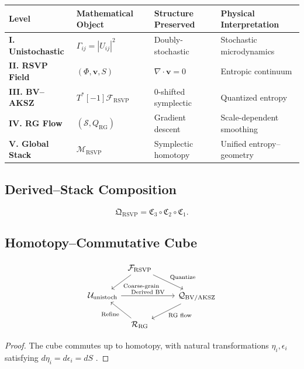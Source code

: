\documentclass[12pt]{article}
\begin{document}
\begin{center}
\begin{tabular}{@{}llll@{}}
\toprule
\textbf{Level} & \textbf{Mathematical Object} & \textbf{Structure Preserved} & \textbf{Physical Interpretation} \\
\midrule
\textbf{I. Unistochastic} & \(\Gamma_{ij} = |U_{ij}|^2\) & Doubly-stochastic & Stochastic microdynamics \\
\textbf{II. RSVP Field} & \((\Phi, \mathbf{v}, S)\) & \(\nabla \cdot \mathbf{v} = 0\) & Entropic continuum \\
\textbf{III. BV–AKSZ} & \(T^*[-1] \mathcal{F}_{\mathrm{RSVP}}\) & 0-shifted symplectic & Quantized entropy \\
\textbf{IV. RG Flow} & \((\mathcal{S}, Q_{\mathrm{RG}})\) & Gradient descent & Scale-dependent smoothing \\
\textbf{V. Global Stack} & \(\mathcal{M}_{\mathrm{RSVP}}\) & Symplectic homotopy & Unified entropy–geometry \\
\bottomrule
\end{tabular}
\end{center}

\subsection{Derived–Stack Composition}

\[
\mathfrak{Q}_{\mathrm{RSVP}} = \mathfrak{C}_3 \circ \mathfrak{C}_2 \circ \mathfrak{C}_1.
\]

\subsection{Homotopy–Commutative Cube}

\[
\begin{tikzcd}
 &[-2em] \mathcal{F}_{\mathrm{RSVP}} \arrow[dr, "\text{Quantize}"] \arrow[dl, "\text{Coarse-grain}"] \\
\mathcal{U}_{\mathrm{unistoch}} \arrow[rr, "\text{Derived BV}"] & & \mathcal{Q}_{\mathrm{BV/AKSZ}} \arrow[dl, "\text{RG flow}"] \\
 & \mathcal{R}_{\mathrm{RG}} \arrow[ul, "\text{Refine}"] &
\end{tikzcd}
\]

\begin{proof}
The cube commutes up to homotopy, with natural transformations \(\eta_i, \epsilon_i\) satisfying \(d \eta_i = d \epsilon_i = dS\) \citep{Pantev2013}.
\end{proof}
\end{document}
